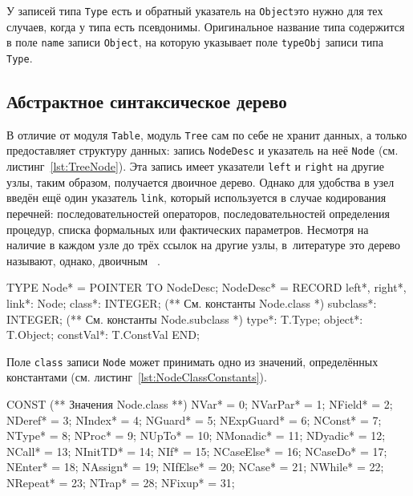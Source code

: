 \documentclass[utf8]{lgu}
\newcommand{\tire}{\unskip\nobreak\thinspace\textemdash\thinspace}
\newcommand{\code}[1]{{\normalsize\texttt{#1}}}
\begin{document}
У записей типа \code{Type} есть и обратный указатель на \code{Object}\tire это нужно для тех случаев, когда у типа есть псевдонимы. Оригинальное название типа содержится в поле \code{name} записи \code{Object}, на которую указывает поле \code{typeObj} записи типа \code{Type}.

\subsection{Абстрактное синтаксическое дерево}

\label{ModuleTree}

В отличие от модуля \code{Table}, модуль \code{Tree} сам по себе не хранит данных, а только предоставляет структуру данных: запись \code{NodeDesc} и указатель на неё \code{Node} (см. листинг~\ref{lst:TreeNode}). Эта запись имеет указатели \code{left} и \code{right} на другие узлы, таким образом, получается двоичное дерево. Однако для удобства в узел введён ещё один указатель \code{link}, который используется в случае кодирования перечней: последовательностей операторов, последовательностей определения процедур, списка формальных или фактических параметров. Несмотря на наличие в каждом узле до трёх ссылок на другие узлы, в~литературе это дерево называют, однако, двоичным~\cite[с.~12]{OP2y1990} \cite[с.~5---6]{OP2y1991}.

\begin{listing}[H]
\caption{Структура данных модуля Tree}
\vspace{-17pt}
\label{lst:TreeNode}
\begin{modula2}
TYPE
  Node* = POINTER TO NodeDesc;
  NodeDesc* = RECORD
    left*, right*, link*: Node;
    class*: INTEGER;     (** См. константы Node.class *)
    subclass*: INTEGER; (** См. константы Node.subclass *)
    type*: T.Type;
    object*: T.Object;
    constVal*: T.ConstVal
  END;
\end{modula2}
\end{listing}

Поле \code{class} записи \code{Node} может принимать одно из значений, определённых константами (см. листинг~\ref{lst:NodeClassConstants}).

\begin{listing}[H]
\caption{Классы узлов абстрактного синтаксического дерева}
\vspace{-17pt}
\label{lst:NodeClassConstants}
\begin{modula2}
CONST
  (** Значения Node.class **)
  NVar*       =  0;    NVarPar*  =  1;    NField*      = 2;
  NDeref*     =  3;    NIndex*    =  4;    NGuard*    = 5;
  NExpGuard* =  6;    NConst*    =  7;    NType*     = 8;
  NProc*      =  9;    NUpTo*    =  10;    NMonadic*  = 11;
  NDyadic*    = 12;    NCall*      = 13;    NInitTD*    = 14;
  NIf*         = 15;    NCaseElse* = 16;    NCaseDo*  = 17;
  NEnter*     = 18;    NAssign*   = 19;    NIfElse*    = 20;
  NCase*      = 21;    NWhile*    = 22;    NRepeat*  = 23;
  NTrap*      = 28;    NFixup*    = 31;
\end{modula2}
\end{listing}
\end{document}
